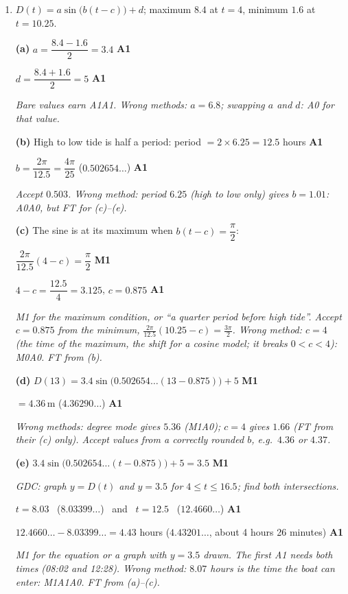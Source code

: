 \documentclass[12pt, twoside]{article}
\begin{document}
\begin{enumerate}[itemsep=0.3cm]
\newpage

\item[2.] [Maximum mark: 11]

$D(t) = a\sin\bigl(b(t - c)\bigr) + d$; maximum $8.4$ at $t = 4$, minimum
$1.6$ at $t = 10.25$.

\textbf{(a)} $a = \dfrac{8.4 - 1.6}{2} = 3.4$ \hfill \textbf{A1}

$d = \dfrac{8.4 + 1.6}{2} = 5$ \hfill \textbf{A1}

\emph{Bare values earn A1A1. Wrong methods: $a = 6.8$; swapping $a$ and
$d$: A0 for that value.}

\textbf{(b)} High to low tide is half a period: period $= 2 \times 6.25 = 12.5$
hours \hfill \textbf{A1}

$b = \dfrac{2\pi}{12.5} = \dfrac{4\pi}{25}$ \quad ($0.502654\ldots$) \hfill \textbf{A1}

\emph{Accept $0.503$. Wrong method: period $6.25$ (high to low only) gives
$b = 1.01$: A0A0, but FT for (c)--(e).}

\textbf{(c)} The sine is at its maximum when $b(t - c) = \dfrac{\pi}{2}$:

$\dfrac{2\pi}{12.5}(4 - c) = \dfrac{\pi}{2}$ \hfill \textbf{M1}

$4 - c = \dfrac{12.5}{4} = 3.125$, \quad $c = 0.875$ \hfill \textbf{A1}

\emph{M1 for the maximum condition, or ``a quarter period before high
tide''. Accept $c = 0.875$ from the minimum,
$\frac{2\pi}{12.5}(10.25 - c) = \frac{3\pi}{2}$. Wrong method: $c = 4$ (the
time of the maximum, the shift for a cosine model; it breaks
$0 < c < 4$): M0A0. FT from (b).}

\textbf{(d)} $D(13) = 3.4\sin\bigl(0.502654\ldots(13 - 0.875)\bigr) + 5$
\hfill \textbf{M1}

$= 4.36$\,m \quad ($4.36290\ldots$) \hfill \textbf{A1}

\emph{Wrong methods: degree mode gives $5.36$ (M1A0); $c = 4$ gives $1.66$
(FT from their (c) only). Accept values from a correctly rounded $b$, e.g.\
$4.36$ or $4.37$.}

\textbf{(e)} $3.4\sin\bigl(0.502654\ldots(t - 0.875)\bigr) + 5 = 3.5$
\hfill \textbf{M1}

\emph{\textit{GDC: graph $y = D(t)$ and $y = 3.5$ for $4 \le t \le 16.5$;
find both intersections.}}

$t = 8.03$ \ ($8.03399\ldots$) \ and \ $t = 12.5$ \ ($12.4660\ldots$)
\hfill \textbf{A1}

$12.4660\ldots - 8.03399\ldots = 4.43$ hours \quad ($4.43201\ldots$, about
4 hours 26 minutes) \hfill \textbf{A1}

\emph{M1 for the equation or a graph with $y = 3.5$ drawn. The first A1
needs both times (08:02 and 12:28). Wrong method: $8.07$ hours is the time
the boat \emph{can} enter: M1A1A0. FT from (a)--(c).}

\end{enumerate}
\end{document}
